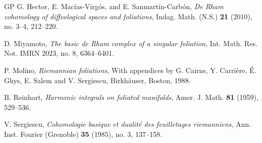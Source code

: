\documentclass[reqno, 11pt]{amsart}
\theoremstyle{definition}
\theoremstyle{property}
\theoremstyle{remark}
\numberwithin{equation}{section}
\begin{document}
\begin{thebibliography}{GP}
G. Hector, E. Mac\'ias-Virg\'os, and E. Sanmart\'in-Carb\'on,
\emph{De Rham cohomology of diffeological spaces and foliations},
Indag. Math. (N.S.) \textbf{21} (2010), no. 3--4, 212--220.

D. Miyamoto,
\emph{The basic de Rham complex of a singular foliation},
Int. Math. Res. Not. IMRN 2023, no. 8, 6364--6401.

P. Molino,
\emph{Riemannian foliations},
With appendices by G. Cairns, Y. Carri\`ere, \'{E}. Ghys, E. Salem and V. Sergiescu,
Birkh\"auser, Boston, 1988.

B. Reinhart,
\emph{Harmonic integrals on foliated manifolds},
Amer. J. Math. \textbf{81} (1959), 529--536.

V. Sergiescu,
\emph{Cohomologie basique et dualit\'e des feuilletages riemanniens},
Ann. Inst. Fourier (Grenoble) \textbf{35} (1985), no. 3, 137--158.

\end{thebibliography}
\end{document}

